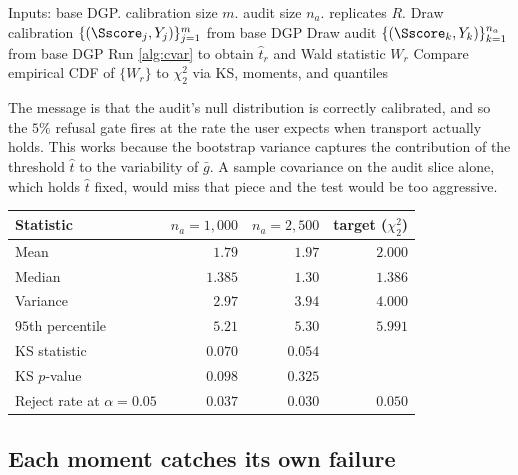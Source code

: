 \documentclass[11pt]{article}
\begin{document}
\begin{algorithm}[H]
\caption{Wald audit calibration MC at base$\to$base, $\delta = 0$.}
\label{alg:wald-mc}
\begin{algorithmic}[1]
\Statex Inputs: base DGP. calibration size $m$. audit size $n_a$. replicates $R$.
  \State Draw calibration $\{(\Sscore_j, Y_j)\}_{j=1}^{m}$ from base DGP
  \State Draw audit $\{(\Sscore_k, Y_k)\}_{k=1}^{n_a}$ from base DGP
  \State Run \cref{alg:cvar} to obtain $\hat t_r$ and Wald statistic $W_r$
\EndFor
\State Compare empirical CDF of $\{W_r\}$ to $\chi^2_2$ via KS, moments, and quantiles
\end{algorithmic}
\end{algorithm}

The message is that the audit's null distribution is correctly calibrated, and so the $5\%$ refusal gate fires at the rate the user expects when transport actually holds. This works because the bootstrap variance captures the contribution of the threshold $\hat t$ to the variability of $\bar g$. A sample covariance on the audit slice alone, which holds $\hat t$ fixed, would miss that piece and the test would be too aggressive.

\begin{table}[H]
\centering
\setlength{\tabcolsep}{8pt}
\begin{tabular}{lrrr}
\toprule
Statistic & $n_a = 1{,}000$ & $n_a = 2{,}500$ & target ($\chi^2_2$) \\
\midrule
Mean                                  & $1.79$  & $1.97$  & $2.000$ \\
Median                                & $1.385$ & $1.30$  & $1.386$ \\
Variance                              & $2.97$  & $3.94$  & $4.000$ \\
$95$th percentile                     & $5.21$  & $5.30$  & $5.991$ \\
KS statistic                          & $0.070$ & $0.054$ & \\
KS $p$-value                          & $0.098$ & $0.325$ & \\
Reject rate at $\alpha = 0.05$         & $0.037$ & $0.030$ & $0.050$ \\
\bottomrule
\end{tabular}
\end{table}

\subsection{Each moment catches its own failure}
\label{app:moment-isolation}
\end{document}
